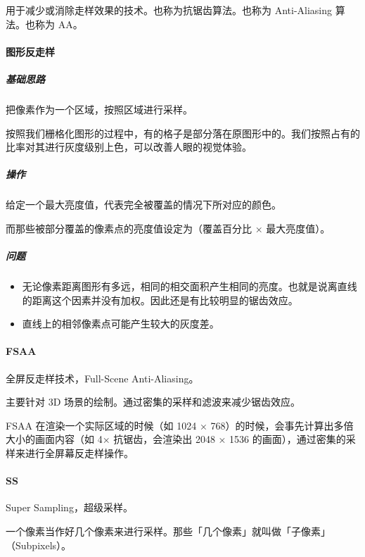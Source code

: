 \documentclass[
]{article}
\begin{document}
用于减少或消除走样效果的技术。也称为抗锯齿算法。也称为 Anti-Aliasing
算法。也称为 AA。

\hypertarget{header-n141}{%
\paragraph{图形反走样}\label{header-n141}}

\hypertarget{header-n142}{%
\subparagraph{基础思路}\label{header-n142}}

把像素作为一个区域，按照区域进行采样。

按照我们栅格化图形的过程中，有的格子是部分落在原图形中的。我们按照占有的比率对其进行灰度级别上色，可以改善人眼的视觉体验。

\hypertarget{header-n145}{%
\subparagraph{操作}\label{header-n145}}

给定一个最大亮度值，代表完全被覆盖的情况下所对应的颜色。

而那些被部分覆盖的像素点的亮度值设定为（覆盖百分比 × 最大亮度值）。

\hypertarget{header-n148}{%
\subparagraph{问题}\label{header-n148}}

\begin{itemize}
\item
  无论像素距离图形有多远，相同的相交面积产生相同的亮度。也就是说离直线的距离这个因素并没有加权。因此还是有比较明显的锯齿效应。
\item
  直线上的相邻像素点可能产生较大的灰度差。
\end{itemize}

\hypertarget{header-n154}{%
\paragraph{FSAA}\label{header-n154}}

全屏反走样技术，Full-Scene Anti-Aliasing。

主要针对 3D 场景的绘制。通过密集的采样和滤波来减少锯齿效应。

FSAA 在渲染一个实际区域的时候（如 1024 ×
768）的时候，会事先计算出多倍大小的画面内容（如 4× 抗锯齿，会渲染出 2048
× 1536 的画面），通过密集的采样来进行全屏幕反走样操作。

\hypertarget{header-n158}{%
\paragraph{SS}\label{header-n158}}

Super Sampling，超级采样。

一个像素当作好几个像素来进行采样。那些「几个像素」就叫做「子像素」（Subpixels）。
\end{document}

